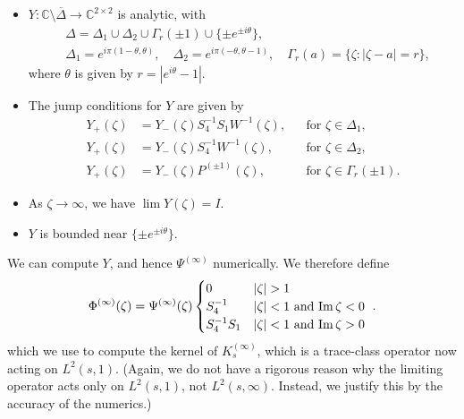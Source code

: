 \documentclass[11pt,fleqn]{article}
\numberwithin{equation}{section}
\def\Im{{\rm Im \,}}
\begin{document}
\begin{itemize}
    \item[(a)] $Y : \mathbb C\setminus \overline\Delta\to \mathbb C^{2\times 2}$ is analytic, with
%
     \begin{align*}
     &\Delta = \Delta_{1} \cup \Delta_{2}\cup \Gamma_r(\pm 1)\cup\{\pm e^{\pm i \theta}\}, \\
     &\Delta_{1} = e^{i \pi (1-\theta,\theta)},\quad   \Delta_{2}  = e^{i \pi (-\theta,\theta-1)},\quad
     \Gamma_r(a)=\{\zeta: |\zeta-a|=r\},
      \end{align*}
      where $\theta$ is given by $r=|e^{i\theta }-1|$.
%
       \item[(b)] The jump conditions for $Y$ are given by
    \begin{align*}
            Y_+(\zeta)&=Y_-(\zeta)   S_4^{-1}S_1W^{-1}(\zeta) ,&& \mbox{for $\zeta\in \Delta_{1}$},\\
        Y_+(\zeta)&=Y_-(\zeta) S_4^{-1}  W^{-1}(\zeta) ,&& \mbox{for $\zeta\in \Delta_{2}$},\\
        Y_+(\zeta)&=Y_-(\zeta) P^{(\pm 1)}(\zeta) ,&& \mbox{for $\zeta\in \Gamma_r(\pm 1)$}.
    \end{align*}
    \item[(c)] As $\zeta\to\infty$, we have $\lim Y(\zeta)= I$.
    \item[(d)] $Y$ is bounded near $\{\pm e^{\pm i \theta}\}$.
\end{itemize}


We can  compute $Y$, and hence $\Psi^{(\infty)}$ numerically.   We therefore define
%
    \begin{equation*}
    \Phi^{(\infty)}(\zeta) = \Psi^{(\infty)}(\zeta) \begin{cases}
                0               & |\zeta| > 1 \\
                S_4^{-1}            & |\zeta| < 1\hbox{ and  $\Im \zeta< 0$ }   \\
                S_4^{-1} S_1        & |\zeta| < 1\hbox{ and  $\Im \zeta > 0$ }
                                      \end{cases}.
                                \end{equation*}
which we use to compute the kernel of  $K_s^{(\infty)}$, which is a trace-class operator now acting on $L^2(s,1)$.
(Again, we do not have a rigorous reason why the limiting operator acts only on $L^2(s,1)$, not $L^2(s,\infty)$.
Instead, we justify this  by the accuracy of the numerics.)
\end{document}
